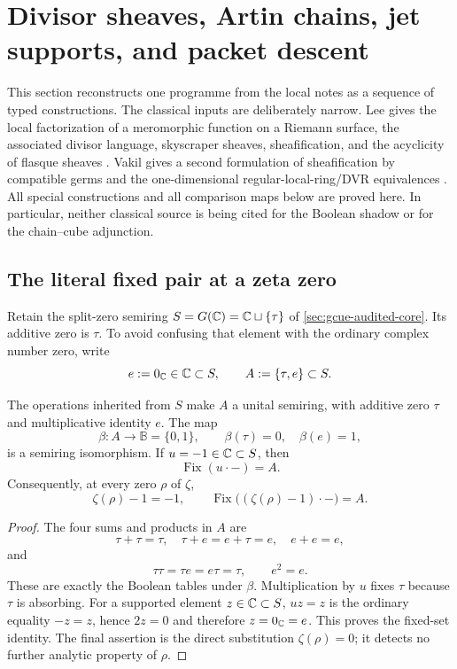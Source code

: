 \section{Divisor sheaves, Artin chains, jet supports, and packet descent}
\label{sec:divisor-sheaf-audit}

This section reconstructs one programme from the local notes as a sequence of
typed constructions.  The classical inputs are deliberately narrow.  Lee gives
the local factorization of a meromorphic function on a Riemann surface, the
associated divisor language, skyscraper sheaves, sheafification, and the
acyclicity of flasque sheaves
\cite[pp.~93--95; Chap.~5, especially Thm.~5.9; pp.~184--188, Thm.~6.34]{lee2024}.
Vakil gives a second formulation of sheafification by compatible germs and the
one-dimensional regular-local-ring/DVR equivalences
\cite[\S\S2.2.9 and 2.4.4--2.4.7; \S13.5]{vakil2024}.
All special constructions and all comparison maps below are proved here.  In
particular, neither classical source is being cited for the Boolean shadow or for
the chain--cube adjunction.

\subsection{The literal fixed pair at a zeta zero}

Retain the split-zero semiring $S=G(\mathbb C)=\mathbb C\sqcup\{\tau\}$ of
\cref{sec:gcue-audited-core}.  Its additive zero is $\tau$.  To avoid confusing
that element with the ordinary complex number zero, write
\[
 e:=0_{\mathbb C}\in\mathbb C\subset S,
 \qquad
 A:=\{\tau,e\}\subset S.
\]

\begin{proposition}
\label{prop:ds-fixed-pair}
The operations inherited from $S$ make $A$ a unital semiring, with additive
zero $\tau$ and multiplicative identity $e$.  The map
\[
 \beta:A\longrightarrow\mathbb B=\{0,1\},
 \qquad \beta(\tau)=0,\quad \beta(e)=1,
\]
is a semiring isomorphism.  If $u=-1\in\mathbb C\subset S$, then
\[
 \operatorname{Fix}(u\cdot-)=A.
\]
Consequently, at every zero $\rho$ of $\zeta$,
\[
 \zeta(\rho)-1=-1,
 \qquad
 \operatorname{Fix}\bigl((\zeta(\rho)-1)\cdot-\bigr)=A.
\]
\end{proposition}

\begin{proof}
The four sums and products in $A$ are
\[
 \tau+\tau=\tau,\quad \tau+e=e+\tau=e,\quad e+e=e,
\]
and
\[
 \tau\tau=\tau e=e\tau=\tau,\qquad e^2=e.
\]
These are exactly the Boolean tables under $\beta$.  Multiplication by $u$ fixes
$\tau$ because $\tau$ is absorbing.  For a supported element $z\in\mathbb C\subset S$,
$uz=z$ is the ordinary equality $-z=z$, hence $2z=0$ and therefore $z=0_{\mathbb C}=e$.
This proves the fixed-set identity.  The final assertion is the direct substitution
$\zeta(\rho)=0$; it detects no further analytic property of $\rho$.
\end{proof}

